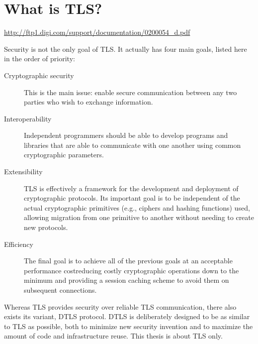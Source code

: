 \section{What is TLS?}




\url{http://ftp1.digi.com/support/documentation/0200054_d.pdf}

Security is not the only goal of TLS. It actually has four main goals, listed here in the order of priority:

\begin{description}
  \item[Cryptographic security]
    This is the main issue: enable secure communication between any two parties who wish to exchange information.
  \item[Interoperability]
    Independent programmers should be able to develop programs and libraries that are able to communicate with one another using common cryptographic parameters.
  \item[Extensibility]
    TLS is effectively a framework for the development and deployment of cryptographic protocols. Its important goal is to be independent of the actual cryptographic primitives (e.g., ciphers and hashing functions) used, allowing migration from one primitive to another without needing to create new protocols.
  \item[Efficiency]
    The final goal is to achieve all of the previous goals at an acceptable performance costreducing costly cryptographic operations down to the minimum and providing a session caching scheme to avoid them on subsequent connections. \cite[p.~2]{ristic2014bulletproof}
\end{description}

Whereas TLS provides security over reliable TLS communication, there also exists its variant, DTLS protocol. DTLS is deliberately designed to be as similar to TLS as possible, both to minimize new security invention and to maximize the amount of code and infrastructure reuse.\cite[p.~4]{rfc6347} This thesis is about TLS only.

